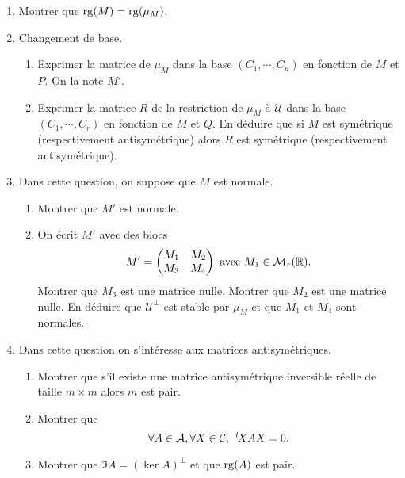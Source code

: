 \begin{enumerate}
 \item Montrer que $\operatorname{rg}(M) = \operatorname{rg}(\mu_M)$.

 \item Changement de base.
 \begin{enumerate}
  \item Exprimer la matrice de $\mu_M$ dans la base $(C_1, \cdots, C_n)$ en fonction de $M$ et $P$. On la note $M'$.
  \item Exprimer la matrice $R$ de la restriction de $\mu_M$ à $\mathcal{U}$ dans la base $(C_1, \cdots, C_r)$ en fonction de $M$ et $Q$. En déduire que si $M$ est symétrique (respectivement antisymétrique) alors $R$ est symétrique (respectivement antisymétrique).
 \end{enumerate}  

 \item Dans cette question, on suppose que $M$ est normale.
 \begin{enumerate}
  \item Montrer que $M'$ est normale.
  \item On écrit $M'$ avec des blocs
\[
 M' = 
 \begin{pmatrix}
  M_1 & M_2 \\ M_3 & M_4
 \end{pmatrix}
\text{ avec } M_1 \in \mathcal{M}_{r}(\mathbb{R}).
\]
Montrer que $M_3$ est une matrice nulle. Montrer que $M_2$ est une matrice nulle. En déduire que $\mathcal{U}^{\bot}$ est stable par $\mu_M$ et que $M_1$ et $M_4$ sont normales.
 \end{enumerate}
 
 \item Dans cette question on s'intéresse aux matrices antisymétriques.
\begin{enumerate}
  \item Montrer que s'il existe une matrice antisymétrique inversible réelle de taille $m\times m$ alors $m$ est pair.
 
 \item Montrer que 
 \[
  \forall A \in \mathcal{A}, \forall X \in \mathcal{C}, \; \,\mathstrut^t\!{X}A X = 0.
 \]
 
 \item Montrer que $\Im A = (\ker A)^\bot$ et que $\operatorname{rg}(A)$ est pair.
 
\end{enumerate}
\end{enumerate}

